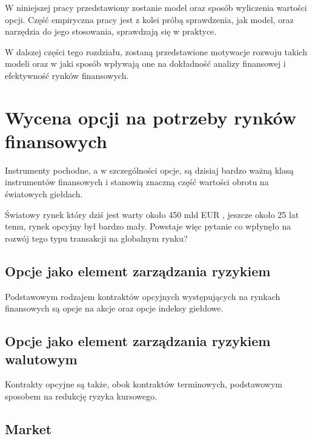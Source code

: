 \documentclass{pracamgr}
\begin{document}
W niniejszej pracy przedstawiony zostanie model oraz sposób wyliczenia wartości opcji.
Część empiryczna pracy jest z kolei próbą sprawdzenia, jak 
model, oraz narzędzia do jego stosowania, sprawdzają się w praktyce.

W dalszej części tego rozdziału, zostaną przedstawione motywacje rozwoju takich modeli oraz w jaki sposób
wpływają one na dokładność analizy finansowej i efektywność rynków finansowych.

\section{Wycena opcji na potrzeby rynków finansowych} %

Instrumenty pochodne, a w szczególności opcje, są dzisiaj bardzo ważną klasą instrumentów finansowych i stanowią znaczną 
część wartości obrotu na światowych giełdach.

Światowy rynek który dziś jest warty około 450 mld EUR \cite{GlobalDerMarket}, jeszcze około 25 lat temu, rynek opcyjny był bardzo mały. Powstaje więc pytanie co wpłynęło na rozwój tego typu transakcji 
na globalnym rynku? 

\subsection{Opcje jako element zarządzania ryzykiem} %
\label{sub:opcje_na_akcje_i_indeksy_gie_dowe}
Podstawowym rodzajem kontraktów opcyjnych występujących na rynkach finansowych są opcje na akcje oraz opcje indeksy 
giełdowe.

\subsection{Opcje jako element zarządzania ryzykiem walutowym} %
\label{sub:opcje_na_rynku_walutowym}
Kontrakty opcyjne są także, obok kontraktów terminowych, podstawowym sposobem na redukcję ryzyka kursowego.



\subsection{Market } %
\label{sub:produkty_strukturyzowane}

\end{document}
